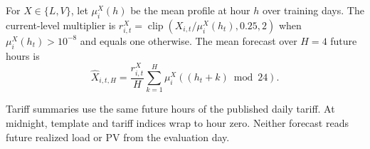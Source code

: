 For $X\in\{L,V\}$, let $\mu_i^X(h)$ be the mean profile at hour $h$
over training days. The current-level multiplier is
$r_{i,t}^X=\operatorname{clip}(X_{i,t}/\mu_i^X(h_t),0.25,2)$
when $\mu_i^X(h_t)>10^{-8}$ and equals one otherwise.
The mean forecast over $H=4$ future hours is
\begin{equation}
 \widehat{X}_{i,t,H}=\frac{r_{i,t}^X}{H}
    \sum_{k=1}^{H}\mu_i^X((h_t+k)\bmod24).
 \label{eq:causal-forecast}
\end{equation}

Tariff summaries use the same future hours of the published daily tariff.
At midnight, template and tariff indices wrap to hour zero.
Neither forecast reads future realized load or PV from the evaluation day.
